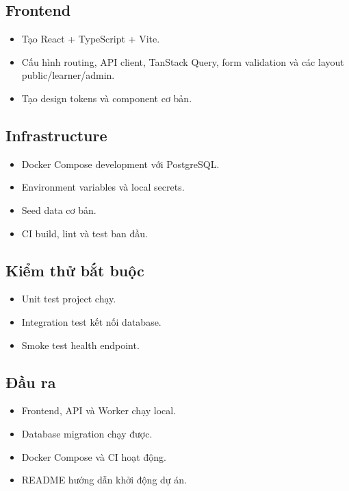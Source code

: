 \documentclass[
  11pt,
  a4paper,
]{article}
\begin{document}
\subsection{Frontend}\label{frontend}

\begin{itemize}
\item
  Tạo React + TypeScript + Vite.
\item
  Cấu hình routing, API client, TanStack Query, form validation và các
  layout public/learner/admin.
\item
  Tạo design tokens và component cơ bản.
\end{itemize}

\subsection{Infrastructure}\label{infrastructure}

\begin{itemize}
\item
  Docker Compose development với PostgreSQL.
\item
  Environment variables và local secrets.
\item
  Seed data cơ bản.
\item
  CI build, lint và test ban đầu.
\end{itemize}

\subsection{Kiểm thử bắt
buộc}\label{kiux1ec3m-thux1eed-bux1eaft-buux1ed9c}

\begin{itemize}
\item
  Unit test project chạy.
\item
  Integration test kết nối database.
\item
  Smoke test health endpoint.
\end{itemize}

\subsection{Đầu ra}\label{ux111ux1ea7u-ra-1}

\begin{itemize}
\item
  Frontend, API và Worker chạy local.
\item
  Database migration chạy được.
\item
  Docker Compose và CI hoạt động.
\item
  README hướng dẫn khởi động dự án.
\end{itemize}
\end{document}
